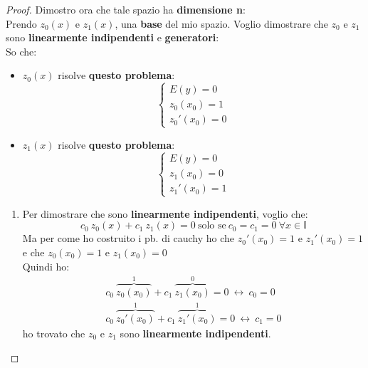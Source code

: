 \documentclass[a4paper, oneside]{article}
\newcommand\I{\mathbb{I}}
\begin{document}
\begin{theorem}
            \begin{proof}
                Dimostro ora che tale spazio ha \textbf{dimensione n}:\\
                Prendo $z_0(x)$ e $z_1(x)$, una \textbf{base} del mio spazio. Voglio dimostrare che $z_0$ e $z_1$ 
                sono \textbf{linearmente indipendenti} e \textbf{generatori}:\\
                So che:
                \begin{itemize}
                    \item $z_0(x)$ risolve \textbf{questo problema}:
                    \[\begin{cases}
                        E(y) = 0\\
                        z_0(x_0)=1\\
                        z_0'(x_0)=0
                    \end{cases}\]
                    \item $z_1(x)$ risolve \textbf{questo problema}:
                    \[\begin{cases}
                        E(y) = 0\\
                        z_1(x_0)=0\\
                        z_1'(x_0)=1
                    \end{cases}\]
                \end{itemize}
                \begin{enumerate}
                    \item Per dimostrare che sono \textbf{linearmente indipendenti}, voglio che:
                    \[c_0 \ z_0(x) + c_1 \ z_1(x) = 0 \ \text{solo se} \ c_0=c_1=0 \ \forall x\in\I\]\noindent
                    Ma per come ho costruito i pb. di cauchy ho che $z_0'(x_0) = 1$ e $z_1'(x_0) = 1$ e che $z_0(x_0) = 1$ e $z_1(x_0) = 0$\\\noindent
                    Quindi ho:
                    \begin{gather*}
                        c_0 \ \overbrace{z_0(x_0)}^1 + c_1 \ \overbrace{z_1(x_0)}^0 = 0 \ \leftrightarrow \ c_0 = 0\\
                        c_0 \ \overbrace{z_0'(x_0)}^1 + c_1 \ \overbrace{z_1'(x_0)}^1 = 0 \ \leftrightarrow \ c_1 = 0
                    \end{gather*}
                    ho trovato che $z_0$ e $z_1$ sono \textbf{linearmente indipendenti}.\\


\end{enumerate}
\end{proof}
\end{theorem}
\end{document}
